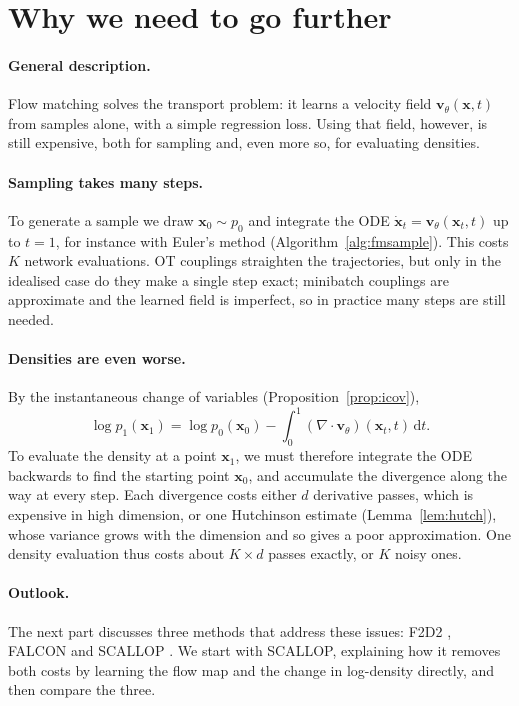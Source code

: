 \documentclass[11pt,a4paper]{article}
\numberwithin{equation}{section}     %
\theoremstyle{plain}        %
\theoremstyle{definition}   %
\theoremstyle{remark}       %
\begin{document}
\newpage

\section{Why we need to go further}\label{sec:further}

\paragraph{General description.} Flow matching solves the transport problem: it learns a velocity field $\mathbf{v}_\theta(\mathbf{x},t)$ from samples alone, with a simple regression loss. Using that field, however, is still expensive, both for sampling and, even more so, for evaluating densities.

\paragraph{Sampling takes many steps.} To generate a sample we draw $\mathbf{x}_0\sim p_0$ and integrate the ODE $\dot{\mathbf{x}}_t=\mathbf{v}_\theta(\mathbf{x}_t,t)$ up to $t=1$, for instance with Euler's method (Algorithm~\ref{alg:fmsample}). This costs $K$ network evaluations. OT couplings straighten the trajectories, but only in the idealised case do they make a single step exact; minibatch couplings are approximate and the learned field is imperfect, so in practice many steps are still needed.

\paragraph{Densities are even worse.} By the instantaneous change of variables (Proposition~\ref{prop:icov}),
\[
\log p_1(\mathbf{x}_1)=\log p_0(\mathbf{x}_0)-\int_0^1\left(\nabla\cdot\mathbf{v}_\theta\right)(\mathbf{x}_t,t)\,\mathrm{d}t .
\]
To evaluate the density at a point $\mathbf{x}_1$, we must therefore integrate the ODE backwards to find the starting point $\mathbf{x}_0$, and accumulate the divergence along the way at every step. Each divergence costs either $d$ derivative passes, which is expensive in high dimension, or one Hutchinson estimate (Lemma~\ref{lem:hutch}), whose variance grows with the dimension and so gives a poor approximation. One density evaluation thus costs about $K\times d$ passes exactly, or $K$ noisy ones.

\paragraph{Outlook.} The next part discusses three methods that address these issues: F2D2 \citep{ai2026}, FALCON \citep{rehman2026} and SCALLOP \citep{ouyang2026}. We start with SCALLOP, explaining how it removes both costs by learning the flow map and the change in log-density directly, and then compare the three.
\end{document}
